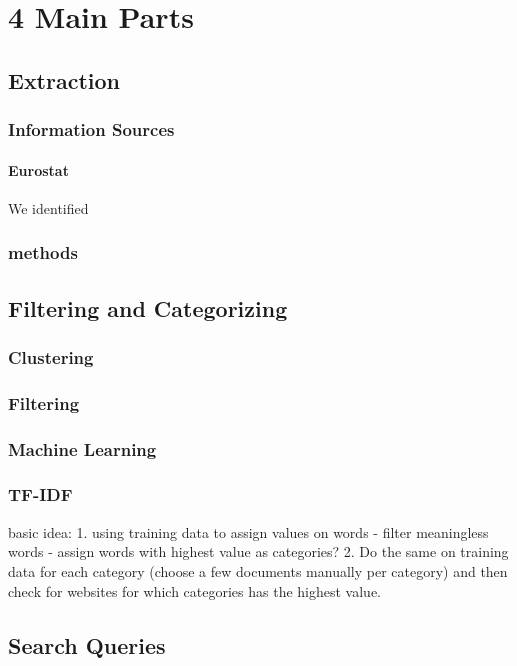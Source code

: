 \section{4 Main Parts}

\subsection{Extraction}
\subsubsection{Information Sources}

\paragraph{Eurostat}
We identified 
\subsubsection{methods}

\subsection{Filtering and Categorizing}

\subsubsection{Clustering}
\subsubsection{Filtering}
\subsubsection{Machine Learning}
\subsubsection{TF-IDF}
basic idea: 1. using training data to assign values on words - filter meaningless words - assign words with highest value as categories? 2. Do the same on training data for each category (choose a few documents manually per category) and then check for websites for which categories has the highest value.

\subsection{Search Queries}

